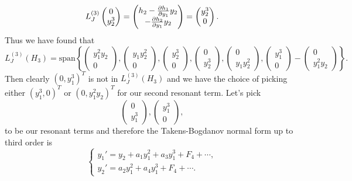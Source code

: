 \documentclass[12pt]{report}
\begin{document}
\begin{solution}
\begin{align*}
        L_J^{(3)}
        \begin{pmatrix} 
            0\\y_2^3 
        \end{pmatrix} &= 
        \begin{pmatrix}
            h_2 - \frac{\partial h_1}{\partial y_1}y_2\\
            -\frac{\partial h_2}{\partial y_1} y_2
        \end{pmatrix} = \begin{pmatrix}
            y_2^3 \\ 0
        \end{pmatrix}.\\
    \end{align*}
    Thus we have found that
    \[  
        L^{(3)}_J(H_3) = \text{span}\left\{ 
        \begin{pmatrix}
            y_1^2 y_2 \\ 0 
        \end{pmatrix},
        \begin{pmatrix}
            y_1 y_2^2 \\ 0
        \end{pmatrix},
        \begin{pmatrix}
            y_2^3 \\ 0
        \end{pmatrix},
        \begin{pmatrix}
            0 \\ y_2^3 
        \end{pmatrix},
        \begin{pmatrix}
            0 \\ y_1 y_2^2
        \end{pmatrix},
        \begin{pmatrix}
            y_1^3\\0
        \end{pmatrix} - \begin{pmatrix}
            0 \\ y_1^2y_2
        \end{pmatrix}\right\}.
    \]
    Then clearly $(0,y_1^3)^T$ is not in $L^{(3)}_J(H_3)$ and we have the choice of picking either $(y_1^3,0)^T$ or $(0,y_1^2y_2)^T$ for our second resonant term. Let's pick
    \[
        \begin{pmatrix}
            0 \\ y_1^3
        \end{pmatrix}, 
        \begin{pmatrix}
            y_1^3 \\ 0
        \end{pmatrix},
    \]
    to be our resonant terms and  therefore the Takens-Bogdanov normal form up to third order is
    \[
        \begin{cases}
            y_1' = y_2 + a_1 y_1^2 + a_3 y_1^3 +  F_4 + \cdots,\\
            y_2' = a_2 y_1^2 + a_4y_1^3 + F_4 + \cdots.
        \end{cases}
    \]



\end{solution}
\end{document}
